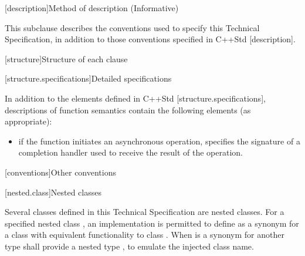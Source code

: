 
[description]{Method of description (Informative)}

\pnum
 This subclause describes the conventions used to specify this Technical Specification, in addition to those conventions specified in C++Std [description].


[structure]{Structure of each clause}


[structure.specifications]{Detailed specifications}

\pnum
In addition to the elements defined in C++Std [structure.specifications], descriptions of function semantics contain the following elements (as appropriate):

\begin{itemize}
\item
\completionsig if the function initiates an asynchronous operation, specifies the signature of a completion handler used to receive the result of the operation.
\end{itemize}




[conventions]{Other conventions}


[nested.class]{Nested classes}

\pnum
Several classes defined in this Technical Specification are nested classes.
For a specified nested class , an implementation is permitted to
define  as a synonym for a class with equivalent functionality to
class . \enternote When  is a synonym for another
type  shall provide a nested type , to emulate the injected
class name. \exitnote


